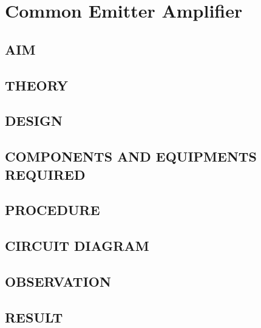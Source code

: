\chapter[Common Emitter Amplifier]{Common Emitter Amplifier}


\section*{AIM}
\section*{THEORY}
\section*{DESIGN}
\section*{COMPONENTS AND EQUIPMENTS REQUIRED}
\section*{PROCEDURE}
\section*{CIRCUIT DIAGRAM}
\section*{OBSERVATION}
\section*{RESULT}

